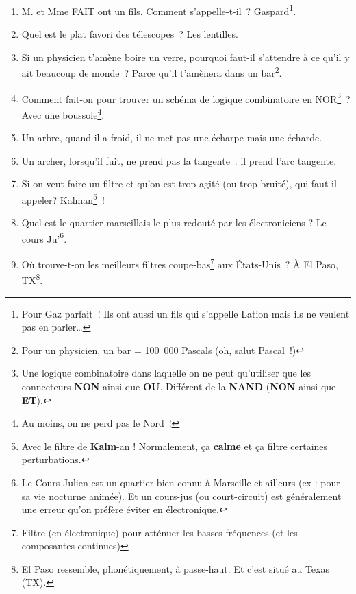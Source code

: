 \documentclass[10pt,a5paper,fullpage]{book}
\begin{document}
\begin{enumerate}
		\textit{\underline{Variante}~: Une prise électrique rend droit comme un} I.\footnote{Le courant est souvent noté I (pour l'intensité) et se mesure en Ampères.} 
		\item M. et Mme FAIT ont un fils. Comment s’appelle-t-il~? Gaspard\footnote{Pour Gaz parfait~! Ils ont aussi un fils qui s’appelle Lation mais ils ne veulent pas en parler\ldots}.
		\item Quel est le plat favori des télescopes~? Les lentilles.
		\item Si un physicien t’amène boire un verre, pourquoi faut-il s’attendre à ce qu’il y ait beaucoup de monde~? Parce qu’il t’amènera dans un bar\footnote{Pour un physicien, un bar = 100 000 Pascals (oh, salut Pascal~!)}.
		\item Comment fait-on pour trouver un schéma de logique combinatoire en NOR\footnote{Une logique combinatoire dans laquelle on ne peut qu’utiliser que les connecteurs \textbf{NON} ainsi que \textbf{OU}. Différent de la \textbf{NAND} (\textbf{NON} ainsi que \textbf{ET}).}~? Avec une boussole\footnote{Au moins, on ne perd pas le Nord~!}.
		\item Un arbre, quand il a froid, il ne met pas une écharpe mais une écharde.
		\item Un archer, lorsqu’il fuit, ne prend pas la tangente~: il prend l’arc tangente.
		\item Si on veut faire un filtre et qu'on est trop agité (ou trop bruité), qui faut-il appeler? Kalman\footnote{Avec le filtre de \textbf{Kalm}-an ! Normalement, ça \textbf{calme} et ça filtre certaines perturbations.}~!
		\item Quel est le quartier marseillais le plus redouté par les électroniciens ? Le cours Ju'\footnote{Le Cours Julien est un quartier bien connu à Marseille et ailleurs (ex : pour sa vie nocturne animée). Et un cours-jus (ou court-circuit) est généralement une erreur qu'on préfère éviter en électronique.}.
 		\item Où trouve-t-on les meilleurs filtres coupe-bas\footnote{Filtre (en électronique) pour atténuer les basses fréquences (et les composantes continues)} aux États-Unis~? À El Paso, TX\footnote{El Paso ressemble, phonétiquement, à passe-haut. Et c'est situé au Texas (TX).}.
	\end{enumerate}
	
\end{document}
